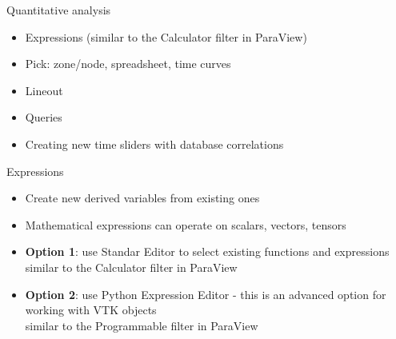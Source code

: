 \begin{comment}
  http://www.vtk.org/download - Download VTK textbook examples and data - PineRoot.tgz
  http://www.vtk.org/files/release/7.0/VTKLargeData-7.0.0.zip
  http://www.visitusers.org/index.php?title=Short_Tutorial
\end{comment}

\begin{frame}{Quantitative analysis}{}
  \begin{itemize}\setlength{\itemsep}{3mm}
  \item Expressions (similar to the Calculator filter in ParaView)
  \item Pick: zone/node, spreadsheet, time curves
  \item Lineout
  \item Queries
  \item Creating new time sliders with database correlations
  \end{itemize}
\end{frame}

\begin{frame}{Expressions}
  \begin{itemize}\setlength{\itemsep}{3mm}
  \item Create new derived variables from existing ones
  \item Mathematical expressions can operate on scalars, vectors, tensors
  \item {\bf Option 1}: use Standar Editor to select existing functions and expressions \\\quad{}
    similar to the Calculator filter in ParaView
  \item {\bf Option 2}: use Python Expression Editor - this is an advanced option for working
    with VTK objects \\\quad{} similar to the Programmable filter in ParaView
  \end{itemize}
\end{frame}

